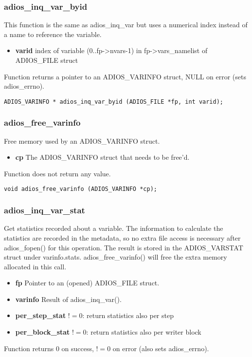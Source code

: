 \subsubsection*{adios\_inq\_var\_byid}
This function is the same as adios\_inq\_var but uses a numerical index instead of a name to reference the variable. 

\begin{itemize}
\item{\bf varid}    index of variable (0..fp->nvars-1)
in fp->vars\_namelist of ADIOS\_FILE struct
\end{itemize}
Function returns a pointer to an  ADIOS\_VARINFO struct, NULL on error (sets adios\_errno).

\begin{lstlisting}[language=ADIOS]
ADIOS_VARINFO * adios_inq_var_byid (ADIOS_FILE *fp, int varid);
\end{lstlisting}

\subsubsection*{adios\_free\_varinfo}
Free memory used by an ADIOS\_VARINFO struct. 
\begin{itemize}
\item{\bf cp} The ADIOS\_VARINFO struct that needs to be free'd. 
\end{itemize}
Function does not return any value.

\begin{lstlisting}[language=ADIOS]
void adios_free_varinfo (ADIOS_VARINFO *cp);
\end{lstlisting}

\subsubsection*{adios\_inq\_var\_stat}
Get statistics recorded about a variable. The information to calculate the statistics are recorded in the metadata,
so no extra file access is necessary after adios\_fopen() for this operation.
The result is stored in the ADIOS\_VARSTAT struct under varinfo.stats. 
adios\_free\_varinfo() will free the extra memory allocated in this call.
\begin{itemize}
\item{\bf fp}  Pointer to an (opened) ADIOS\_FILE struct.
\item{\bf  varinfo}        Result of adios\_inq\_var(). 
\item{\bf per\_step\_stat}  $!=0$: return statistics also per step
\item{\bf per\_block\_stat} $!=0$: return statistics also per writer block 
\end{itemize}
Function returns 0 on success, $!=0$ on error (also sets adios\_errno). 

